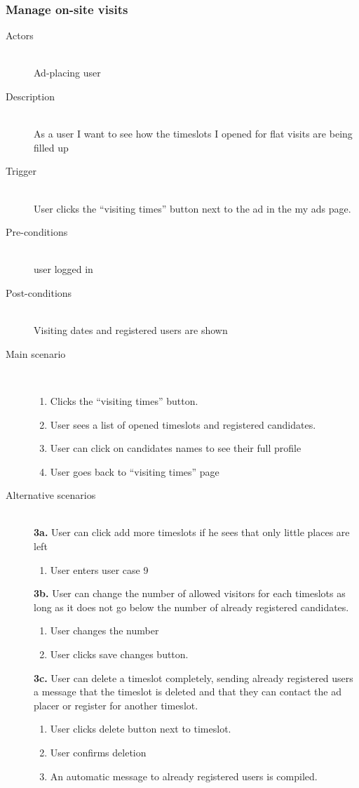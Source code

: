 \documentclass[a4wide]{article}
\begin{document}
\subsubsection{Manage on-site visits}
\begin{description}
\item[Actors]\mbox{}\\
Ad-placing user
\item[Description]\mbox{}\\
As a user I want to see how the timeslots I opened for flat visits are being filled up
\item[Trigger]\mbox{}\\
User clicks the “visiting times” button next to the ad in the my ads page.
\item[Pre-conditions]\mbox{}\\
user logged in
\item[Post-conditions]\mbox{}\\
Visiting dates and registered users are shown
\item[Main scenario]\mbox{}\\
\begin{enumerate}
\item Clicks the “visiting times” button.
\item User sees a list of opened timeslots and registered candidates. 
\item User can click on candidates names to see their full profile
\item User goes back to “visiting times” page
\end{enumerate}
\item[Alternative scenarios]\mbox{}\\
\textbf{3a.} User can click add more timeslots if he sees that only little places are left
\begin{enumerate}
\item User enters user case 9
\end{enumerate}
\textbf{3b.} User can change the number of allowed visitors for each timeslots as long as it does not go below the number of already registered candidates.
\begin{enumerate}
\item User changes the number
\item User clicks save changes button.
\end{enumerate}
\textbf{3c.} User can delete a timeslot completely, sending already registered users a message that the timeslot is deleted and that they can contact the ad placer or register for another timeslot.
\begin{enumerate}
\item User clicks delete button next to timeslot.
\item User confirms deletion
\item An automatic message to already registered users is compiled.
\end{enumerate}
\end{description}
\end{document}
